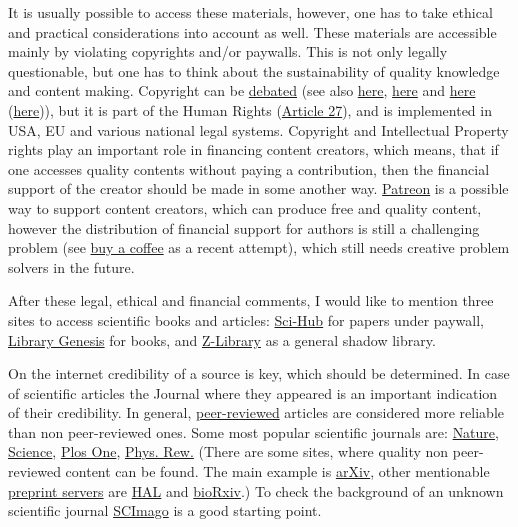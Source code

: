 \documentclass{article}
\begin{document}
It is usually possible to access these materials, however, one has to take ethical and practical considerations into account as well.
These materials are accessible mainly by violating copyrights and/or paywalls. This is not only legally questionable, but one has to think about the sustainability of quality knowledge and content making. Copyright can be \href{https://link.springer.com/chapter/10.1007/978-981-10-3984-3_7}{debated} (see also \href{https://www.youtube.com/watch?v=rFMl0stqai0}{here}, \href{https://en.wikipedia.org/wiki/Criticism_of_copyright}{here} and \href{https://en.wikipedia.org/wiki/Right_to_science_and_culture}{here} (\href{https://www.ted.com/talks/lawrence_lessig_laws_that_choke_creativity}{here})), but it is part of the Human Rights (\href{https://www.humanrights.com/what-are-human-rights/videos/copyright.html}{Article 27}), and is implemented in USA, EU and various national legal systems. Copyright and Intellectual Property rights play an important role in financing content creators, which means, that if one accesses quality contents without paying a contribution, then the financial support of the creator should be made in some another way.
\href{https://www.patreon.com/}{Patreon} is a possible way to support content creators, which can produce free and quality content, however the distribution of financial support for authors is still a challenging problem (see \href{https://ko-fi.com/}{buy a coffee} as a recent attempt), which still needs creative problem solvers in the future.

After these legal, ethical and financial comments, I would like to mention three sites to access scientific books and articles: \href{https://en.wikipedia.org/wiki/Sci-Hub}{Sci-Hub} for papers under paywall, \href{https://en.wikipedia.org/wiki/Library_Genesis}{Library Genesis} for books, and \href{https://en.wikipedia.org/wiki/Z-Library}{Z-Library} as a general shadow library.

On the internet credibility of a source is key, which should be determined. In case of scientific articles the Journal where they appeared is an important indication of their credibility. In general, \href{https://en.wikipedia.org/wiki/Peer_review}{peer-reviewed} articles are considered more reliable than non peer-reviewed ones. Some most popular scientific journals are: \href{https://www.nature.com/}{Nature}, \href{https://www.sciencemag.org/}{Science}, \href{https://journals.plos.org/plosone/}{Plos One}, \href{https://journals.aps.org/}{Phys. Rew.} (There are some sites, where quality non peer-reviewed content can be found. The main example is \href{https://arxiv.org/}{arXiv}, other mentionable \href{https://en.wikipedia.org/wiki/List_of_preprint_repositories}{preprint servers} are \href{https://hal.archives-ouvertes.fr/}{HAL} and \href{https://www.biorxiv.org/}{bioRxiv}.) To check the background of an unknown scientific journal \href{https://www.scimagojr.com/}{SCImago} is a good starting point.
\end{document}
